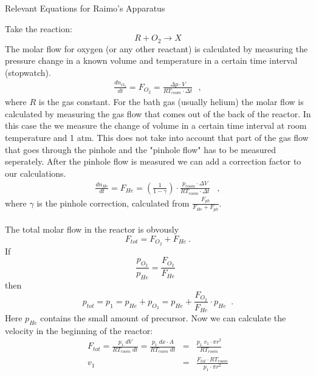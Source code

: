 \documentclass[10pt, a4paper]{article}
\begin{document}
\begin{center}
\begin{huge}
Relevant Equations for Raimo's Apparatus
\end{huge}
\end{center}
Take the reaction: 
\begin{equation*}
R + O_2 \rightarrow X
\end{equation*}
The molar flow for oxygen (or any other reactant) is calculated by measuring the pressure change in a known volume and temperature in a certain time interval (stopwatch). 
\begin{eqnarray*}
\frac{dn_{O_2}}{dt} = F_{O_2} = \frac{\Delta p \cdot V}{RT_{room} \cdot \Delta t} \:\:\:, 
\end{eqnarray*}
where $R$ is the gas constant. For the bath gas (usually helium) the molar flow is calculated by measuring the gas flow that comes out of the back of the reactor. In this case the we measure the change of volume in a certain time interval at room temperature and 1 atm. This does not take into account that part of the gas flow that goes through the pinhole and the "pinhole flow" has to be measured seperately. After the pinhole flow is measured we can add a correction factor to our calculations. 
\begin{eqnarray*}
\frac{dn_{He}}{dt} = F_{He} = \left( \frac{1}{1 - \gamma} \right) \cdot \frac{p_{room} \cdot \Delta V}{RT_{room} \cdot \Delta t} \;\;\;,
\end{eqnarray*}
where $\gamma$ is the pinhole correction, calculated from $ \frac{F_{ph}}{F_{He} + F_{ph}} $. 
\\
\\
The total molar flow in the reactor is obvously 
\begin{equation*}
F_{tot} = F_{O_2} + F_{He} \:.
\end{equation*}
If 
\begin{equation*}
\frac{p_{O_2}}{p_{He}} =  \frac{F_{O_2}}{F_{He}} \;\;
\end{equation*}
then 
\begin{equation*}
p_{tot} = p_1 = p_{He} + p_{O_2} =  p_{He} + \frac{F_{O_2}}{F_{He}} \cdot p_{He} \;\;.
\end{equation*}
Here $p_{He}$ contains the small amount of precursor. Now we can calculate the velocity in the beginning of the reactor: 
\begin{eqnarray*}
F_{tot} = \frac{p_1\;dV}{RT_{room}\;dt} = \frac{p_1\; dx \cdot A}{RT_{room}\;dt} &=& \frac{p_1\; v_1 \cdot \pi r^2}{RT_{room}} \\
v_1 &=& \frac{F_{tot} \cdot RT_{room}}{p_1 \cdot \pi r^2}
\end{eqnarray*}
\end{document}

